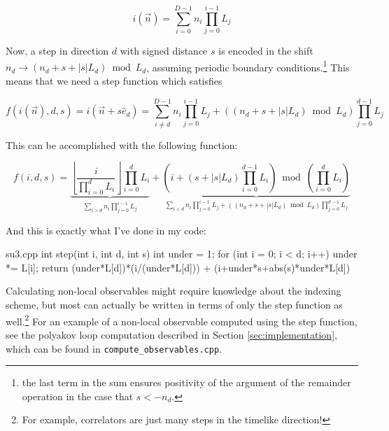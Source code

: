 \documentclass[11pt]{article}
\begin{document}
\begin{equation}i(\vec n)=\sum_{i=0}^{D-1}n_i\prod_{j=0}^{i-1}L_j\end{equation}

Now, a step in direction $d$ with signed distance $s$ is encoded in the shift $n_d\to(n_d+s+|s|L_d)\bmod L_d$, assuming periodic boundary conditions.\footnote{the last term in the sum ensures positivity of the argument of the remainder operation in the case that $s<-n_d$.} This means that we need a step function which satisfies

\begin{equation}f(i(\vec n),d,s)=i(\vec n+s\hat e_d)=\sum_{i\neq d}^{D-1}n_i\prod_{j=0}^{i-1}L_j+((n_d+s+|s|L_d)\bmod L_d)\prod_{j=0}^{d-1}L_j\end{equation}

This can be accomplished with the following function:

\begin{equation}f(i,d,s)=\underbrace{\left\lfloor\frac{i}{\prod_{i=0}^d L_i}\right\rfloor\prod_{i=0}^dL_i}_{\sum_{i>d}n_i\prod_{j=0}^{i-1}L_j} + \underbrace{\left(i+(s+|s|L_d)\prod_{i=0}^{d-1}L_i\right)\bmod \left(\prod_{i=0}^dL_i\right)}_{\sum_{i<d}n_i\prod_{j=0}^{i-1}L_j+((n_d+s+|s|L_d)\bmod L_d)\prod_{j=0}^{d-1}L_j}\end{equation}

And this is exactly what I've done in my code:

\begin{center}
\begin{minipage}{0.8\linewidth}
\begin{code}{su3.cpp}
int step(int i, int d, int s) {
        int under = 1;
        for (int i = 0; i < d; i++) {
                under *= L[i];
        }
        return (under*L[d])*(i/(under*L[d])) + (i+under*s+abs(s)*under*L[d])%
}
\end{code}
\end{minipage}
\end{center}

Calculating non-local observables might require knowledge about the indexing scheme, but most can actually be written in terms of only the step function as well.\footnote{For example, correlators are just many steps in the timelike direction!} For an example of a non-local observable computed using the step function, see the polyakov loop computation described in Section \ref{sec:implementation}, which can be found in \lstinline{compute_observables.cpp}.
\end{document}

